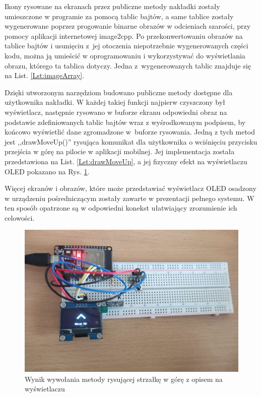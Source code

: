 \documentclass[12pt,twoside]{article}
\begin{document}


Ikony rysowane na ekranach przez publiczne metody nakładki zostały umieszczone w programie za pomocą tablic bajtów, a same tablice zostały wygenerowane poprzez progowanie binarne obrazów w odcieniach szarości, przy pomocy aplikacji internetowej image2cpp\cite{image2cpp}. Po przekonwertowaniu obrazów na tablice bajtów i usunięciu z~jej otoczenia niepotrzebnie wygenerowanych części kodu, można ją umieścić w oprogramowaniu i wykorzystywać do wyświetlania obrazu, którego ta tablica dotyczy. Jedna z~wygenerowanych tablic znajduje się na List. \ref*{Lst:imageArray}.



Dzięki utworzonym narzędziom budowano publiczne metody dostępne dla użytkownika nakładki. W każdej takiej funkcji najpierw czyszczony był wyświetlacz, następnie rysowano w buforze ekranu odpowiedni obraz na podstawie zdefiniowanych tablic bajtów wraz z wyśrodkowanym podpisem, by końcowo wyświetlić dane zgromadzone w~buforze rysowania. Jedną z tych metod jest ,,drawMoveUp()'' rysująca komunikat dla użytkownika o wciśnięciu przycisku przejścia w górę na pilocie w aplikacji mobilnej. Jej implementacja została przedstawiona na List. \ref*{Lst:drawMoveUp}, a jej fizyczny efekt na wyświetlaczu OLED pokazano na Rys. \ref*{Fig:drawMoveUp}.



Więcej ekranów i obrazów, które może przedstawiać wyświetlacz OLED osadzony w urządzeniu pośredniczącym zostały zawarte w prezentacji pełnego systemu. W ten sposób opatrzone są w odpowiedni konekst ułatwiający zrozumienie ich celowości.

\begin{figure}[ht]
   \centering
   \includegraphics[width=14cm]{images/drawMoveUp.jpg}
   \caption{Wynik wywołania metody rysującej strzałkę w górę z opisem na wyświetlaczu}
   \label{Fig:drawMoveUp}
\end{figure}
\end{document}
